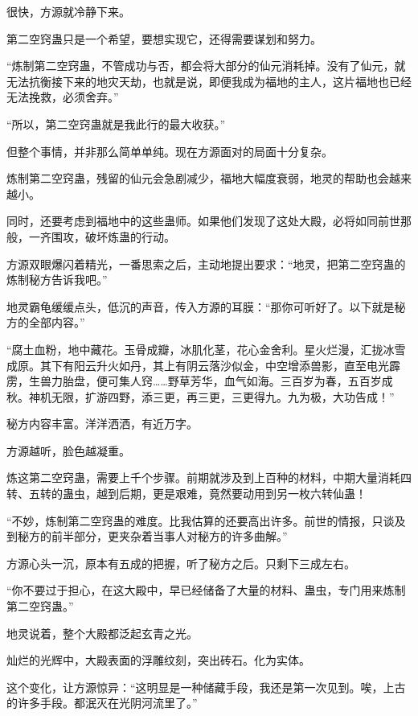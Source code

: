 
\begin{this_body}

很快，方源就冷静下来。

第二空窍蛊只是一个希望，要想实现它，还得需要谋划和努力。

“炼制第二空窍蛊，不管成功与否，都会将大部分的仙元消耗掉。没有了仙元，就无法抗衡接下来的地灾天劫，也就是说，即便我成为福地的主人，这片福地也已经无法挽救，必须舍弃。”

“所以，第二空窍蛊就是我此行的最大收获。”

但整个事情，并非那么简单单纯。现在方源面对的局面十分复杂。

炼制第二空窍蛊，残留的仙元会急剧减少，福地大幅度衰弱，地灵的帮助也会越来越小。

同时，还要考虑到福地中的这些蛊师。如果他们发现了这处大殿，必将如同前世那般，一齐围攻，破坏炼蛊的行动。

方源双眼爆闪着精光，一番思索之后，主动地提出要求：“地灵，把第二空窍蛊的炼制秘方告诉我吧。”

地灵霸龟缓缓点头，低沉的声音，传入方源的耳膜：“那你可听好了。以下就是秘方的全部内容。”

“腐土血粉，地中藏花。玉骨成瓣，冰肌化茎，花心金舍利。星火烂漫，汇拢冰雪成原。其下有阳云升火如丹，其上有阴云落沙似金，中空增添兽影，直至电光霹雳，生兽力胎盘，便可集人窍……野草芳华，血气如海。三百岁为春，五百岁成秋。神机无限，扩游四野，添三更，再三更，三更得九。九为极，大功告成！”

秘方内容丰富。洋洋洒洒，有近万字。

方源越听，脸色越凝重。

炼这第二空窍蛊，需要上千个步骤。前期就涉及到上百种的材料，中期大量消耗四转、五转的蛊虫，越到后期，更是艰难，竟然要动用到另一枚六转仙蛊！

“不妙，炼制第二空窍蛊的难度。比我估算的还要高出许多。前世的情报，只谈及到秘方的前半部分，更夹杂着当事人对秘方的许多曲解。”

方源心头一沉，原本有五成的把握，听了秘方之后。只剩下三成左右。

“你不要过于担心，在这大殿中，早已经储备了大量的材料、蛊虫，专门用来炼制第二空窍蛊。”

地灵说着，整个大殿都泛起玄青之光。

灿烂的光辉中，大殿表面的浮雕纹刻，突出砖石。化为实体。

这个变化，让方源惊异：“这明显是一种储藏手段，我还是第一次见到。唉，上古的许多手段。都泯灭在光阴河流里了。”


\end{this_body}
